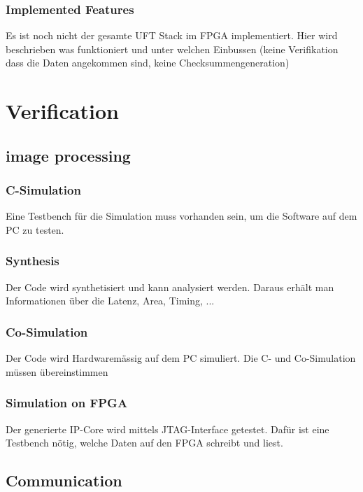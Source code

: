 \subsubsection{Implemented Features}
Es ist noch nicht der gesamte UFT Stack im FPGA implementiert. Hier wird beschrieben
was funktioniert und unter welchen Einbussen (keine Verifikation dass die Daten
angekommen sind, keine Checksummengeneration)

\section{Verification}
\subsection{image processing}
\subsubsection{C-Simulation}
Eine Testbench für die Simulation muss vorhanden sein, um die Software auf dem PC zu testen.

\subsubsection{Synthesis}
Der Code wird synthetisiert und kann analysiert werden. Daraus erhält man Informationen über die Latenz, Area, Timing, ...

\subsubsection{Co-Simulation}
Der Code wird Hardwaremässig auf dem PC simuliert. Die C- und Co-Simulation müssen übereinstimmen

\subsubsection{Simulation on FPGA}
Der generierte IP-Core wird mittels JTAG-Interface getestet. Dafür ist eine Testbench nötig, welche Daten auf den FPGA schreibt und liest.

\subsection{Communication}
